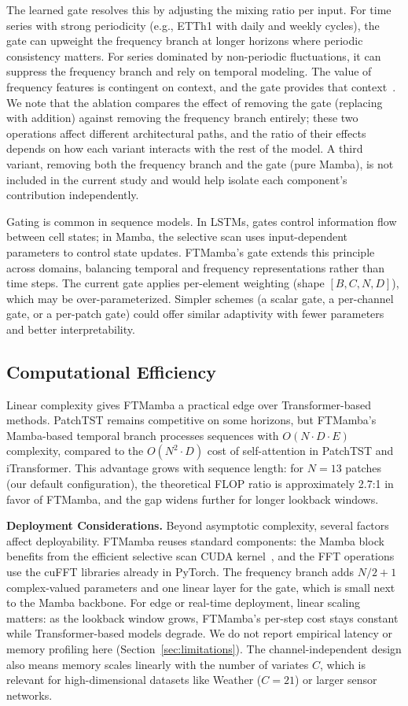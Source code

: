 \documentclass[symmetry,article,submit,pdftex,moreauthors]{Definitions/mdpi}
\begin{document}
The learned gate resolves this by adjusting the mixing ratio per input. For time series with strong periodicity (e.g., ETTh1 with daily and weekly cycles), the gate can upweight the frequency branch at longer horizons where periodic consistency matters. For series dominated by non-periodic fluctuations, it can suppress the frequency branch and rely on temporal modeling. The value of frequency features is contingent on context, and the gate provides that context~\cite{ref6,ref7}. We note that the ablation compares the effect of removing the gate (replacing with addition) against removing the frequency branch entirely; these two operations affect different architectural paths, and the ratio of their effects depends on how each variant interacts with the rest of the model. A third variant, removing both the frequency branch and the gate (pure Mamba), is not included in the current study and would help isolate each component's contribution independently.

Gating is common in sequence models. In LSTMs, gates control information flow between cell states; in Mamba, the selective scan uses input-dependent parameters to control state updates. FTMamba's gate extends this principle across domains, balancing temporal and frequency representations rather than time steps. The current gate applies per-element weighting (shape $[B, C, N, D]$), which may be over-parameterized. Simpler schemes (a scalar gate, a per-channel gate, or a per-patch gate) could offer similar adaptivity with fewer parameters and better interpretability.

\subsection{Computational Efficiency}

Linear complexity gives FTMamba a practical edge over Transformer-based methods. PatchTST remains competitive on some horizons, but FTMamba's Mamba-based temporal branch processes sequences with $O(N \cdot D \cdot E)$ complexity, compared to the $O(N^2 \cdot D)$ cost of self-attention in PatchTST and iTransformer. This advantage grows with sequence length: for $N=13$ patches (our default configuration), the theoretical FLOP ratio is approximately 2.7:1 in favor of FTMamba, and the gap widens further for longer lookback windows.

\textbf{Deployment Considerations.} Beyond asymptotic complexity, several factors affect deployability. FTMamba reuses standard components: the Mamba block benefits from the efficient selective scan CUDA kernel~\cite{ref10}, and the FFT operations use the cuFFT libraries already in PyTorch. The frequency branch adds $N/2+1$ complex-valued parameters and one linear layer for the gate, which is small next to the Mamba backbone. For edge or real-time deployment, linear scaling matters: as the lookback window grows, FTMamba's per-step cost stays constant while Transformer-based models degrade. We do not report empirical latency or memory profiling here (Section~\ref{sec:limitations}). The channel-independent design also means memory scales linearly with the number of variates $C$, which is relevant for high-dimensional datasets like Weather ($C=21$) or larger sensor networks.
\end{document}
